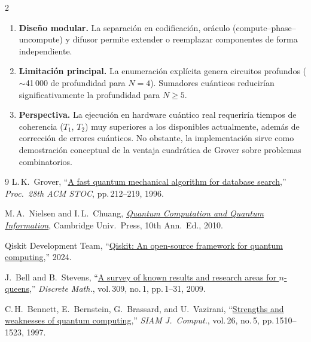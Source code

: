 \documentclass[9pt, a4paper]{extarticle}
\begin{document}
\begin{multicols}{2}
\begin{enumerate}
    \item \textbf{Dise\~no modular.}
          La separaci\'on en codificaci\'on, or\'aculo
          (compute--phase--uncompute) y difusor permite extender o
          reemplazar componentes de forma independiente.

    \item \textbf{Limitaci\'on principal.}
          La enumeraci\'on expl\'icita genera circuitos profundos
          ($\sim$41\,000 de profundidad para $N\!=\!4$).
          Sumadores cu\'anticos reducir\'ian significativamente la
          profundidad para $N\!\geq\!5$.

    \item \textbf{Perspectiva.}
          La ejecuci\'on en hardware cu\'antico real requerir\'ia
          tiempos de coherencia ($T_1$, $T_2$) muy superiores a los
          disponibles actualmente, adem\'as de correcci\'on de errores
          cu\'anticos. No obstante, la implementaci\'on sirve como
          demostraci\'on conceptual de la ventaja cuadr\'atica de Grover
          sobre problemas combinatorios.
\end{enumerate}

\begin{thebibliography}{9}
\small
    L.\,K.~Grover,
    ``\href{https://doi.org/10.1145/237814.237866}{A fast quantum mechanical algorithm for database search},''
    \textit{Proc.\ 28th ACM STOC}, pp.\,212--219, 1996.

    M.\,A.~Nielsen and I.\,L.~Chuang,
    \href{https://doi.org/10.1017/CBO9780511976667}{\textit{Quantum Computation and Quantum Information}},
    Cambridge Univ.\ Press, 10th Ann.\ Ed., 2010.

    Qiskit Development Team,
    ``\href{https://qiskit.org}{Qiskit: An open-source framework for quantum computing},''
    2024.

    J.~Bell and B.~Stevens,
    ``\href{https://doi.org/10.1016/j.disc.2007.12.043}{A survey of known results and research areas for $n$-queens},''
    \textit{Discrete Math.}, vol.\,309, no.\,1, pp.\,1--31, 2009.

    C.\,H.~Bennett, E.~Bernstein, G.~Brassard, and U.~Vazirani,
    ``\href{https://doi.org/10.1137/S0097539796300933}{Strengths and weaknesses of quantum computing},''
    \textit{SIAM J.\ Comput.}, vol.\,26, no.\,5, pp.\,1510--1523, 1997.


\end{thebibliography}
\end{multicols}
\end{document}

